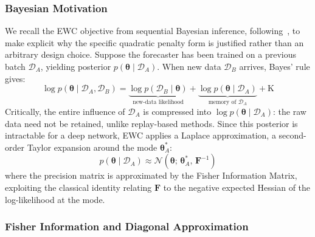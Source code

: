 \documentclass[journal]{IEEEtran}
\newcommand{\fisher}{\mathbf{F}}
\newcommand{\params}{\bm{\theta}}
\begin{document}
\subsubsection{Bayesian Motivation}
\label{sec:bayesian}

We recall the EWC objective from sequential Bayesian inference,
following~\cite{kirkpatrick2017overcoming}, to make explicit why the
specific quadratic penalty form is justified rather than an arbitrary
design choice. Suppose the forecaster has been trained on a previous
batch $\mathcal{D}_A$, yielding posterior $p(\params \mid \mathcal{D}_A)$.
When new data $\mathcal{D}_B$ arrives, Bayes' rule gives:
\begin{equation}
    \log p(\params \mid \mathcal{D}_A, \mathcal{D}_B) =
    \underbrace{\log p(\mathcal{D}_B \mid \params)}_{\text{new-data likelihood}}
    + \underbrace{\log p(\params \mid \mathcal{D}_A)}_{\text{memory of }\mathcal{D}_A}
    + \text{K}
    \label{eq:log_posterior}
\end{equation}
Critically, the entire influence of $\mathcal{D}_A$ is compressed into
$\log p(\params \mid \mathcal{D}_A)$: the raw data need not be retained,
unlike replay-based methods. Since this posterior is intractable for a
deep network, EWC applies a Laplace approximation, a second-order
Taylor expansion around the mode $\params_A^*$:
\begin{equation}
    p(\params \mid \mathcal{D}_A) \approx
    \mathcal{N}(\params;\, \params_A^*,\, \fisher^{-1})
    \label{eq:fisher_posterior}
\end{equation}
where the precision matrix is approximated by the Fisher Information
Matrix, exploiting the classical identity relating $\fisher$ to the
negative expected Hessian of the log-likelihood at the mode.

\subsubsection{Fisher Information and Diagonal Approximation}
\label{sec:fisher}
\end{document}
